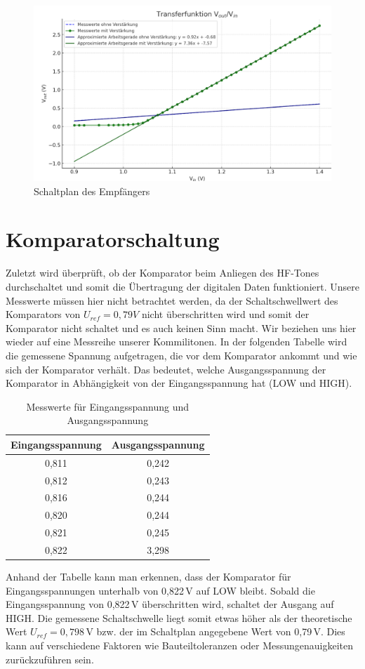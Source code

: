 \begin{figure}[H]
    \centering
    \includegraphics[width=1\textwidth]{Pictures/Transferfunktion.png}
    \caption{Schaltplan des Empfängers}
    \label{fig:opamp_schaltung}
\end{figure}


\section{Komparatorschaltung} %
Zuletzt wird überprüft, ob der Komparator beim Anliegen des HF-Tones durchschaltet und somit die Übertragung der digitalen Daten funktioniert.
Unsere Messwerte müssen hier nicht betrachtet werden, da der Schaltschwellwert des Komparators von
$U_{ref}= 0,79V$ nicht überschritten wird und somit der Komparator nicht schaltet und es auch keinen Sinn macht.
Wir beziehen uns hier wieder auf eine Messreihe unserer Kommilitonen. In der folgenden Tabelle wird die gemessene Spannung 
aufgetragen, die vor dem Komparator ankommt und wie sich der Komparator verhält. Das bedeutet, welche Ausgangsspannung
der Komparator in Abhängigkeit von der Eingangsspannung hat (LOW und HIGH).

\begin{table}[h]
\centering
\begin{tabular}{cc}
\textbf{Eingangsspannung} & \textbf{Ausgangsspannung} \\
\hline
0{,}811 & 0{,}242 \\
0{,}812 & 0{,}243 \\
0{,}816 & 0{,}244 \\
0{,}820 & 0{,}244 \\
0{,}821 & 0{,}245 \\
0{,}822 & 3{,}298 \\
\end{tabular}
\caption{Messwerte für Eingangsspannung und Ausgangsspannung}
\end{table}

Anhand der Tabelle kann man erkennen, dass der Komparator für Eingangsspannungen unterhalb von 0{,}822\,V auf LOW bleibt. Sobald die Eingangsspannung von 0{,}822\,V überschritten wird, schaltet der Ausgang auf HIGH. Die gemessene Schaltschwelle liegt somit etwas höher als der theoretische Wert $U_{ref} = 0{,}798$\,V bzw. der im Schaltplan angegebene Wert von 0{,}79\,V. Dies kann auf verschiedene Faktoren wie Bauteiltoleranzen oder Messungenauigkeiten zurückzuführen sein.